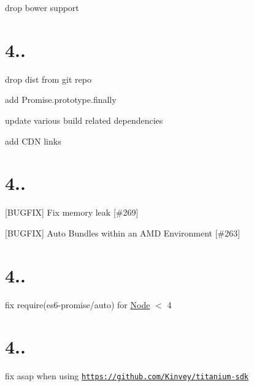 \begin{DoxyItemize}
\item drop bower support
\end{DoxyItemize}

\section*{4..}


\begin{DoxyItemize}
\item drop {\ttfamily dist} from git repo
\item add {\ttfamily Promise.\+prototype.\+finally}
\item update various build related dependencies
\item add C\+DN links
\end{DoxyItemize}

\section*{4..}


\begin{DoxyItemize}
\item \mbox{[}B\+U\+G\+F\+IX\mbox{]} Fix memory leak \mbox{[}\#269\mbox{]}
\item \mbox{[}B\+U\+G\+F\+IX\mbox{]} Auto Bundles within an A\+MD Environment \mbox{[}\#263\mbox{]}
\end{DoxyItemize}

\section*{4..}


\begin{DoxyItemize}
\item fix require(\textquotesingle{}es6-\/promise/auto\textquotesingle{}) for \mbox{\hyperlink{classNode}{Node}} $<$ 4
\end{DoxyItemize}

\section*{4..}


\begin{DoxyItemize}
\item fix asap when using \href{https://github.com/Kinvey/titanium-sdk}{\tt https\+://github.\+com/\+Kinvey/titanium-\/sdk}
\end{DoxyItemize}

